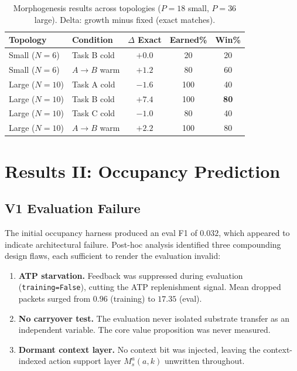 \documentclass[10pt,twocolumn]{article}
\newcommand{\Ms}{M_s}
\begin{document}
\begin{table}[t]
\centering
\caption{Morphogenesis results across topologies ($P=18$ small, $P=36$ large).
  Delta: growth minus fixed (exact matches).}
\label{tab:morphogenesis}
\small
\begin{tabular}{llccc}
\toprule
Topology & Condition & $\Delta$ Exact & Earned\% & Win\% \\
\midrule
Small ($N=6$)  & Task B cold   & $+0.0$ & 20 & 20 \\
Small ($N=6$)  & $A\to B$ warm & $+1.2$ & 80 & 60 \\
\midrule
Large ($N=10$) & Task A cold   & $-1.6$ & 100 & 40 \\
Large ($N=10$) & Task B cold   & $\mathbf{+7.4}$ & 100 & \textbf{80} \\
Large ($N=10$) & Task C cold   & $-1.0$ & 80  & 40 \\
Large ($N=10$) & $A\to B$ warm & $+2.2$ & 100 & 80 \\
\bottomrule
\end{tabular}
\end{table}

\section{Results II: Occupancy Prediction}
\label{sec:occupancy}

\subsection{V1 Evaluation Failure}
\label{sec:v1_failure}

The initial occupancy harness produced an eval F1 of $0.032$, which appeared
to indicate architectural failure.
Post-hoc analysis identified three compounding design flaws, each sufficient
to render the evaluation invalid:

\begin{enumerate}[leftmargin=*, topsep=2pt, itemsep=1pt]
  \item \textbf{ATP starvation.} Feedback was suppressed during evaluation
    (\texttt{training=False}), cutting the ATP replenishment signal.
    Mean dropped packets surged from $0.96$ (training) to $17.35$ (eval).
  \item \textbf{No carryover test.} The evaluation never isolated substrate
    transfer as an independent variable. The core value proposition was
    never measured.
  \item \textbf{Dormant context layer.} No context bit was injected, leaving
    the context-indexed action support layer $\Ms^a(a, k)$ unwritten
    throughout.
\end{enumerate}
\end{document}
